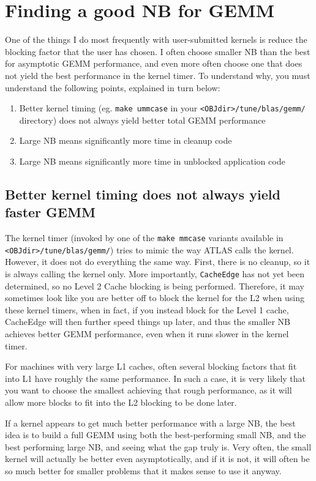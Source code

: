 \documentclass[11pt]{article}
\begin{document}
\section{Finding a good NB for GEMM}
One of the things I do most frequently with user-submitted kernels is reduce
the blocking factor that the user has chosen.  I often choose smaller NB
than the best for asymptotic GEMM performance, and even more often choose
one that does not yield the best performance in the kernel timer.
To understand why, you must understand the following points, explained in
turn below:
\begin{enumerate}
\item Better kernel timing (eg. {\tt make ummcase} in your 
{\tt <OBJdir>/tune/blas/gemm/} directory) does not always yield better
total GEMM performance
\item Large NB means significantly more time in cleanup code
\item Large NB means significantly more time in unblocked application code
\end{enumerate}
\subsection{Better kernel timing does not always yield faster GEMM}
The kernel timer (invoked by one of the {\tt make mmcase} variants
available in {\tt <OBJdir>/tune/blas/gemm/}) tries to mimic the way
ATLAS calls the kernel.  However, it does not do everything the same way.
First, there is no cleanup, so it is always calling the kernel only.  More
importantly, {\tt CacheEdge} has not yet been determined, so no
Level 2 Cache blocking is being performed.  Therefore, it may sometimes
look like you are better off to block the kernel for the L2 when using
these kernel timers, when in fact, if you instead block for the Level 1 cache,
CacheEdge will then further speed things up later, and thus the smaller
NB achieves better GEMM performance, even when it runs slower in the kernel
timer.  

For machines with very large L1 caches, often several blocking factors that
fit into L1 have roughly the same performance.  In such a case, it is very
likely that you want to choose the smallest achieving that rough
performance, as it will allow more blocks to fit into the L2 blocking
to be done later.

If a kernel appears to get much better performance with a large NB, the
best idea is to build a full GEMM using both the best-performing small
NB, and the best performing large NB, and seeing what the gap truly is.
Very often, the small kernel will actually be better even asymptotically,
and if it is not, it will often be so much better for smaller problems
that it makes sense to use it anyway.
\end{document}
